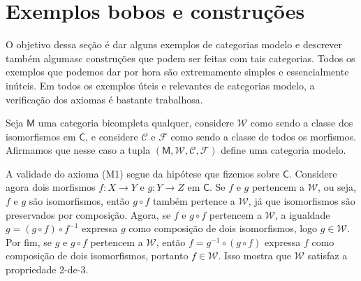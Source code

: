 \section{Exemplos bobos e construções}

O objetivo dessa seção é dar alguns exemplos de categorias modelo e descrever também algumasc construções que podem ser feitas com tais categorias.
Todos os exemplos que podemos dar por hora são extremamente simples e essencialmente inúteis.
Em todos os exemplos úteis e relevantes de categorias modelo, a verificação dos axiomas é bastante trabalhosa.

\begin{exem}
  Seja $\mathsf{M}$ uma categoria bicompleta qualquer, considere $\mathcal{W}$ como sendo a classe dos isomorfismos em $\mathsf{C}$, e considere $\mathcal{C}$ e $\mathcal{F}$ como sendo a classe de todos os morfismos.
  Afirmamos que nesse caso a tupla $(\mathsf{M},\mathcal{W},\mathcal{C},\mathcal{F})$ define uma categoria modelo.

  A validade do axioma (M1) segue da hipótese que fizemos sobre $\mathsf{C}$.
  Considere agora dois morfismos $f: X \to Y$ e $g: Y \to Z$ em $\mathsf{C}$.
  Se $f$ e $g$ pertencem a $\mathcal{W}$, ou seja, $f$ e $g$ são isomorfismos, então $g \circ f$ também pertence a $\mathcal{W}$, já que isomorfismos são preservados por composição.
  Agora, se $f$ e $g \circ f$ pertencem a $\mathcal{W}$, a igualdade $g = (g \circ f) \circ f^{-1}$ expressa $g$ como composição de dois isomorfismos, logo $g \in \mathcal{W}$.
  Por fim, se $g$ e $g \circ f$ pertencem a $\mathcal{W}$, então $f = g^{-1} \circ (g \circ f)$ expressa $f$ como composição de dois isomorfismos, portanto $f \in \mathcal{W}$.
  Isso mostra que $\mathcal{W}$ satisfaz a propriedade 2-de-3.


\end{exem}
